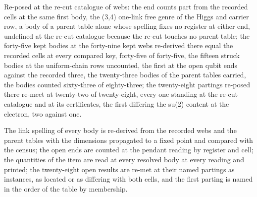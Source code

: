 \begin{chwall}
Re-posed at the re-cut catalogue of webs: the end counts part from the recorded cells at the same first body, the (3,4) one-link free genre of the Higgs and carrier row, a body of a parent table alone whose spelling fixes no register at either end, undefined at the re-cut catalogue because the re-cut touches no parent table; the forty-five kept bodies at the forty-nine kept webs re-derived there equal the recorded cells at every compared key, forty-five of forty-five, the fifteen struck bodies at the uniform-chain rows uncounted, the first at the open qubit ends against the recorded three, the twenty-three bodies of the parent tables carried, the bodies counted sixty-three of eighty-three; the twenty-eight partings re-posed there re-meet at twenty-two of twenty-eight, every one standing at the re-cut catalogue and at its certificates, the first differing the su(2) content at the electron, two against one.
\end{chwall}
The link spelling of every body is re-derived from the recorded webs and the parent tables with the dimensions propagated to a fixed point and compared with the census; the open ends are counted at the pendant reading by register and cell; the quantities of the item are read at every resolved body at every reading and printed; the twenty-eight open results are re-met at their named partings as instances, as located or as differing with both cells, and the first parting is named in the order of the table by membership.

